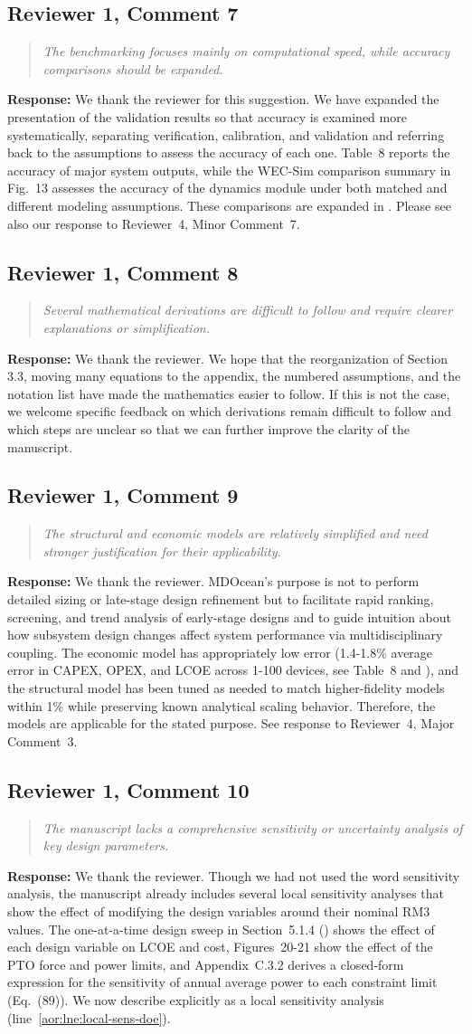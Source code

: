 \documentclass[11pt]{article}
\newcommand{\rcomment}[2]{\subsection*{#1}\begin{quote}\itshape #2\end{quote}}
\newcommand{\response}{\noindent\textbf{Response:} }
\begin{document}
\rcomment{Reviewer 1, Comment 7}{The benchmarking focuses mainly on computational speed, while accuracy comparisons should be expanded.}
\response We thank the reviewer for this suggestion. We have expanded the presentation of the validation results so that accuracy is examined more systematically, separating verification, calibration, and validation and referring back to the assumptions to assess the accuracy of each one.
Table~8 reports the accuracy of major system outputs, while the WEC-Sim comparison summary in Fig.~13 assesses the accuracy of the dynamics module under both matched and different modeling assumptions.
These comparisons are expanded in .
Please see also our response to Reviewer~4, Minor Comment~7.

\rcomment{Reviewer 1, Comment 8}{Several mathematical derivations are difficult to follow and require clearer explanations or simplification.}
\response We thank the reviewer.
We hope that the reorganization of Section 3.3, moving many equations to the appendix, the numbered assumptions, and the notation list have made the mathematics easier to follow.
If this is not the case, we welcome specific feedback on which derivations remain difficult to follow and which steps are unclear so that we can further improve the clarity of the manuscript.

\rcomment{Reviewer 1, Comment 9}{The structural and economic models are relatively simplified and need stronger justification for their applicability.}
\response We thank the reviewer.
MDOcean's purpose is not to perform detailed sizing or late-stage design refinement but to facilitate rapid ranking, screening, and trend analysis of early-stage designs and to guide intuition about how subsystem design changes affect system performance via multidisciplinary coupling.
The economic model has appropriately low error (1.4-1.8\% average error in CAPEX, OPEX, and LCOE across 1-100 devices, see Table~8 and ),
and the structural model has been tuned as needed to match higher-fidelity models within 1\% while preserving known analytical scaling behavior.
Therefore, the models are applicable for the stated purpose.
See response to Reviewer~4, Major Comment~3.

\rcomment{Reviewer 1, Comment 10}{The manuscript lacks a comprehensive sensitivity or uncertainty analysis of key design parameters.}
\response We thank the reviewer. Though we had not used the word sensitivity analysis, the manuscript already includes several local sensitivity analyses that show the effect of modifying the design variables around their nominal RM3 values.
The one-at-a-time design sweep in Section~5.1.4 () shows the effect of each design variable on LCOE and cost, Figures~20-21 show the effect of the PTO force and power limits, and Appendix~C.3.2 derives a closed-form expression for the sensitivity of annual average power to each constraint limit (Eq.~(89)).
We now describe  explicitly as a local sensitivity analysis (line~\ref{aor:lne:local-sens-doe}).
\end{document}
